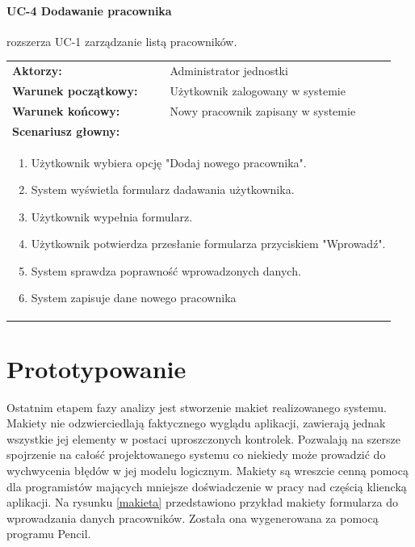 \paragraph{UC-4 Dodawanie pracownika}
rozszerza UC-1 zarządzanie listą pracowników.\\
\begin{tabular}{ll}
	\textbf{Aktorzy:} & Administrator jednostki \\
	
	\textbf{Warunek początkowy:} & Użytkownik zalogowany w systemie \\
	\textbf{Warunek końcowy:} & Nowy pracownik zapisany w systemie \\
	\multicolumn{2}{l}{\textbf{Scenariusz głowny:}}\\
	\multicolumn{2}{l}{
	\begin{minipage}{\textwidth}\begin{enumerate}
		\item Użytkownik wybiera opcję "Dodaj nowego pracownika".
		\item System wyświetla formularz dadawania użytkownika.
		\item Użytkownik wypełnia formularz.
		\item Użytkownik potwierdza przesłanie formularza przyciskiem "Wprowadź".
		\item System sprawdza poprawność wprowadzonych danych.
		\item System zapisuje dane nowego pracownika
	\end{enumerate}\end{minipage}
	}
\end{tabular}
	
\section[Prototypowanie][Prototypowanie]{Prototypowanie}
Ostatnim etapem fazy analizy jest stworzenie makiet realizowanego systemu. Makiety nie odzwierciedlają faktycznego wyglądu aplikacji, zawierają jednak wszystkie jej elementy w postaci uproszczonych kontrolek. Pozwalają na szersze spojrzenie na całość projektowanego systemu co niekiedy może prowadzić do wychwycenia błędów w jej modelu logicznym. Makiety są wreszcie cenną pomocą dla programistów mających mniejsze doświadczenie w pracy nad częścią kliencką aplikacji. Na rysunku \ref{makieta} przedstawiono przykład makiety formularza do wprowadzania danych pracowników. Została ona wygenerowana za pomocą programu Pencil.

